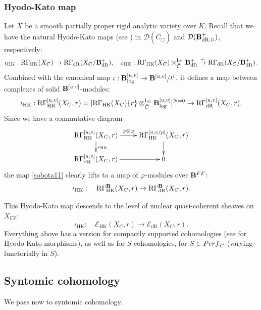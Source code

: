\documentclass[10pt,reqno]{amsart}
\theoremstyle{definition}
\theoremstyle{remark}
\def\phi{\varphi}
\newcommand{\dr}{\operatorname{dR} }
\newcommand{\hk}{\operatorname{HK} }
\newcommand{\LL}{\operatorname{L} }
\newcommand{\FF}{\operatorname{FF} }
\newcommand{\se}{{\mathcal{E}}}
\newcommand{\sd}{{\mathcal{D}}}
\numberwithin{equation}{section}
\def\R{{\mathrm R}}
\def\HKi{$\iota_{\hk}$}
\numberwithin{equation}{section}
\begin{document}
\subsubsection{Hyodo-Kato map} Let $X$ be a smooth partially proper rigid analytic variety   over $K$. 
Recall that we have the natural Hyodo-Kato maps (see \cite[Sec.\,4]{CN4}) in $\sd(\breve{C}_{\Box})$ and $\sd(\B^+_{\dr,\Box})$, \index{HKi@\HKi}respectively:
$$
\iota_{\hk}: \R\Gamma_{\hk}(X_C) \to \R\Gamma_{\dr}(X_C/\B^+_{\dr}),\quad \iota_{\hk}: \R\Gamma_{\hk}(X_C)\otimes^{\LL_{\Box}}_{\breve{C}}\B^+_{\dr}\stackrel{\sim}{\to}  \R\Gamma_{\dr}(X_C/\B^+_{\dr}).
$$
Combined with the  canonical map
$\iota: {\bf B}^{[u,v]}_{\log}\to {\bf B}^{[u,v]}/t^i$,   it defines a map between complexes of solid
${\bf B}^{[u,v]}$-modules:
\begin{equation}\label{sobota11}
\iota_{\hk}: \R\Gamma_{\hk}^{{[u,v]}}(X_C,r) =[ \R\Gamma_{\hk}(X_C)\{r\}\otimes^{\LL_{\Box}}_{\breve{C}}
\B^{[u,v]}_{\log}]^{N=0}\to \R\Gamma^{{[u,v]}}_{\dr}(X_C,r).
\end{equation}
Since we have a commutative diagram
\begin{equation}\label{tiger2}
\xymatrix@R=5mm{\R\Gamma_{\hk}^{{[u,v]}}(X_C,r)\ar[d]^{\iota_{\hk}}\ar[r]^-{\phi\otimes\phi} 
& \R\Gamma_{\hk}^{{[u,v/p]}}(X_C,r)\ar[d]\\
 \R\Gamma^{{[u,v]}}_{\dr}(X_C,r)\ar[r] &  0
}
\end{equation}
the map \eqref{sobota11} clearly lifts to a map of $\phi$-modules over $\B^{\rm FF}$:
$$
\iota_{\hk}: \quad\R\Gamma^{\B}_{\hk}(X_C,r) \to \R\Gamma^{\B}_{\dr}(X_C,r).
$$

  This  Hyodo-Kato map descends to the level of nuclear quasi-coherent sheaves on $X_{\FF}$:
$$\iota_{\hk}:\quad \se_{\hk}(X_C,r)\to  \se_{\dr}(X_C,r).
$$ Everything above has a version for compactly supported cohomologies (see \cite[Sec.\,3.2.2]{AGN} for Hyodo-Kato morphisms), as well as for $S$-cohomologies, for $S\in{\rm Perf}_C$ (varying functorially in $S$).


 \subsection{Syntomic cohomology}\label{sing2}
We pass now to  syntomic cohomology. 
\end{document}
